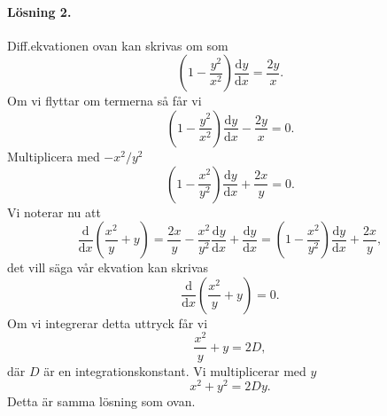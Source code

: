 \documentclass[%
oneside,                 %
final,                   %
10pt]{article}
\begin{document}
\paragraph{Lösning 2.}
Diff.ekvationen ovan kan skrivas om som
\begin{equation}
  \left(1 - \frac{y^2}{x^2}\right) \frac{\mbox{d}y}{\mbox{d}x} = \frac{2y}{x}.
\end{equation}
Om vi flyttar om termerna så får vi
\begin{equation}
  \left(1 - \frac{y^2}{x^2}\right) \frac{\mbox{d}y}{\mbox{d}x} - \frac{2y}{x} = 
0.
\end{equation}
Multiplicera med $-x^2/y^2$
\begin{equation}
  \left(1 - \frac{x^2}{y^2}\right) \frac{\mbox{d}y}{\mbox{d}x} + \frac{2x}{y}
= 0.
\end{equation}
Vi noterar nu att 
\begin{equation}
  \frac{\mbox{d}}{\mbox{d}x} \left(\frac{x^2}{y} + y\right) =
\frac{2x}{y} - \frac{x^2}{y^2} \frac{\mbox{d}y}{\mbox{d}x} + 
\frac{\mbox{d}y}{\mbox{d}x} = \left(1 - \frac{x^2}{y^2}\right) 
\frac{\mbox{d}y}{\mbox{d}x} + \frac{2x}{y},
\end{equation}
det vill säga vår ekvation kan skrivas
\begin{equation}
  \frac{\mbox{d}}{\mbox{d}x} \left(\frac{x^2}{y} + y\right) = 0.
\end{equation}
Om vi integrerar detta uttryck får vi
\begin{equation}
  \frac{x^2}{y} + y = 2D,
\end{equation}
där $D$ är en integrationskonstant.  Vi multiplicerar med $y$
\begin{equation}
  x^2 + y^2 = 2Dy.
\end{equation}
Detta är samma lösning som ovan.


\end{document}
